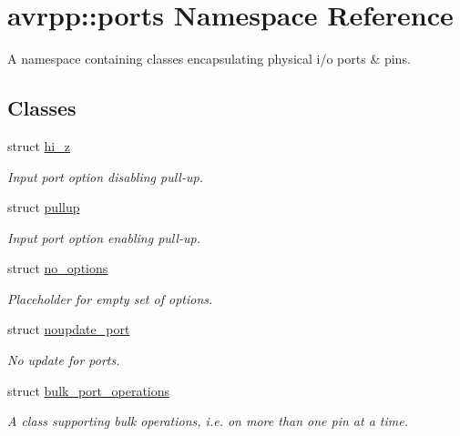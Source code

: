 \hypertarget{namespaceavrpp_1_1ports}{
\section{avrpp::ports Namespace Reference}
\label{namespaceavrpp_1_1ports}
}


A namespace containing classes encapsulating physical i/o ports \& pins.  


\subsection*{Classes}
\begin{DoxyCompactItemize}
\item 
struct \hyperlink{structavrpp_1_1ports_1_1hi__z}{hi\_\-z}
\begin{DoxyCompactList}\small\item\em Input port option disabling pull-\/up. \item\end{DoxyCompactList}\item 
struct \hyperlink{structavrpp_1_1ports_1_1pullup}{pullup}
\begin{DoxyCompactList}\small\item\em Input port option enabling pull-\/up. \item\end{DoxyCompactList}\item 
struct \hyperlink{structavrpp_1_1ports_1_1no__options}{no\_\-options}
\begin{DoxyCompactList}\small\item\em Placeholder for empty set of options. \item\end{DoxyCompactList}\item 
struct \hyperlink{structavrpp_1_1ports_1_1noupdate__port}{noupdate\_\-port}
\begin{DoxyCompactList}\small\item\em No update for ports. \item\end{DoxyCompactList}\item 
struct \hyperlink{structavrpp_1_1ports_1_1bulk__port__operations}{bulk\_\-port\_\-operations}
\begin{DoxyCompactList}\small\item\em A class supporting bulk operations, i.e. on more than one pin at a time. \item\end{DoxyCompactList}\item 

\end{DoxyCompactItemize}
